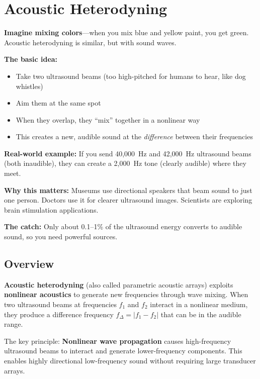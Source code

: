\chapter{Acoustic Heterodyning}
\label{ch:acoustic-heterodyning}

\begin{nontechnical}
\textbf{Imagine mixing colors}---when you mix blue and yellow paint, you get green. Acoustic heterodyning is similar, but with sound waves.

\textbf{The basic idea:}
\begin{itemize}
\item Take two ultrasound beams (too high-pitched for humans to hear, like dog whistles)
\item Aim them at the same spot
\item When they overlap, they ``mix'' together in a nonlinear way
\item This creates a new, audible sound at the \emph{difference} between their frequencies
\end{itemize}

\textbf{Real-world example:} If you send 40,000~Hz and 42,000~Hz ultrasound beams (both inaudible), they can create a 2,000~Hz tone (clearly audible) where they meet.

\textbf{Why this matters:} Museums use directional speakers that beam sound to just one person. Doctors use it for clearer ultrasound images. Scientists are exploring brain stimulation applications.

\textbf{The catch:} Only about 0.1--1\% of the ultrasound energy converts to audible sound, so you need powerful sources.
\end{nontechnical}

\section{Overview}

\textbf{Acoustic heterodyning} (also called parametric acoustic arrays) exploits \textbf{nonlinear acoustics} to generate new frequencies through wave mixing. When two ultrasound beams at frequencies $f_1$ and $f_2$ interact in a nonlinear medium, they produce a difference frequency $f_\Delta = |f_1 - f_2|$ that can be in the audible range.

\begin{keyconcept}
The key principle: \textbf{Nonlinear wave propagation} causes high-frequency ultrasound beams to interact and generate lower-frequency components. This enables highly directional low-frequency sound without requiring large transducer arrays.
\end{keyconcept}

